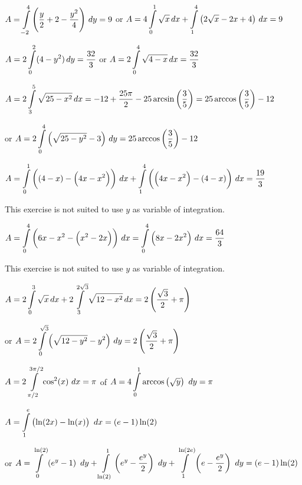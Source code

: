 \begin{Answer}

\Question $A=\displaystyle \int\limits_{-2}^{4} \left( \dfrac{y}{2} + 2 - \dfrac{y^2}{4}  \right)\, dy = 9$ \quad or \quad $A=4 \displaystyle \int\limits_{0}^{1} \sqrt{x} \, dx + \displaystyle \int\limits_{1}^{4} \left( 2\sqrt{x}-2x+4 \right) \, dx=9$

\Question $A =  2 \displaystyle \int\limits_{0}^{2}(4-y^2) \, dy =  \dfrac{32}{3}$ \quad or \quad $A = 2 \displaystyle \int\limits_{0}^{4} \sqrt{4-x} \, dx =  \dfrac{32}{3}$

\Question $A=2 \displaystyle \int\limits_{3}^{5} \sqrt{25-x^2} \, dx = -12 + \dfrac{25 \pi}{2}-25 \arcsin \left( \dfrac{3}{5}  \right) = 25 \arccos \left( \dfrac{3}{5}  \right) -12 $ 

 or \quad $A=2 \displaystyle \int\limits_{0}^{4} \left( \sqrt{25-y^2} -3  \right)\, dy = 25 \arccos \left( \dfrac{3}{5}  \right) -12 $

\Question $A= \displaystyle \int\limits_{0}^{1}\left(\left(4-x\right) - \left(4x-x^2\right)  \right) \, dx + \displaystyle \int\limits_{1}^{4} \left( \left(4x-x^2 \right) - \left(4-x \right) \right) \, dx= \dfrac{19}{3}$

 This exercise is not suited to use $y$ as variable of integration. 

\Question $A =\displaystyle \int\limits_{0}^{4}\left(6x-x^2 - \left( x^2-2x \right) \right) \, dx = \displaystyle \int\limits_{0}^{4}\left(8x-2x^2 \right) \, dx = \dfrac{64}{3}$ 

 This exercise is not suited to use $y$ as variable of integration.  

\Question $A=2 \displaystyle \int\limits_{0}^{3} \sqrt{x} \, dx + 2 \displaystyle \int\limits_{3}^{2 \sqrt{3}} \sqrt{12-x^2} \, dx = 2 \left( \dfrac{\sqrt{3}}{2} + \pi\right) $

 or \quad $A=2 \displaystyle \int\limits_{0}^{\sqrt{3}} \left( \sqrt{12-y^2} - y^2 \right)\, dy = 2 \left( \dfrac{\sqrt{3}}{2} + \pi\right)$
 
\Question $A=2 \displaystyle \int\limits_{\pi/2}^{3\pi/2} \cos^2(x) \ dx= \pi $ \quad of \quad $A=4 \displaystyle \int\limits_{0}^{1} \arccos \left( \sqrt{y} \right)\ dy= \pi$
	
\Question $A= \displaystyle \int\limits_{1}^{e} \left( \ln(2x) - \ln(x) \right) \ dx = (e-1) \ln(2)$

 or \quad $A= \displaystyle \int\limits_{0}^{\ln(2)} \left( e^{y} - 1 \right)\ dy + \displaystyle \int\limits_{\ln(2)}^{1} \left( e^{y} - \dfrac{e^y}{2} \right) \ dy + \displaystyle \int\limits_{1}^{\ln(2e)} \left( e - \dfrac{e^y}{2} \right)\ dy= (e-1) \ln(2)$


\end{Answer}
